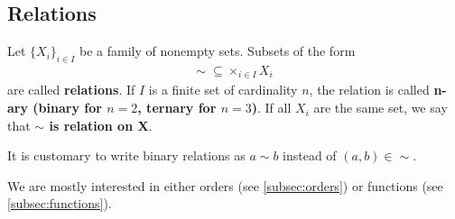 \subsection{Relations}\label{subsec:relations}

\begin{definition}\label{def:relation}
  Let \( \{ X_i \}_{i \in I} \) be a family of nonempty sets.
  Subsets of the form
  \begin{align*}
    \sim\; \subseteq \times_{i \in I} X_i
  \end{align*}
  are called \textbf{relations}. If \( I \) is a finite set of cardinality \( n \), the relation is called \textbf{n-ary (binary for \( n = 2 \), ternary for \( n = 3 \))}. If all \( X_i \) are the same set, we say that \textbf{\( \sim \) is relation on X}.

  It is customary to write binary relations as \( a \sim b \) instead of \( (a, b) \in \sim \).
\end{definition}

\begin{note}\label{note:main_relation_types}
  We are mostly interested in either orders (see \cref{subsec:orders}) or functions (see \cref{subsec:functions}).
\end{note}

